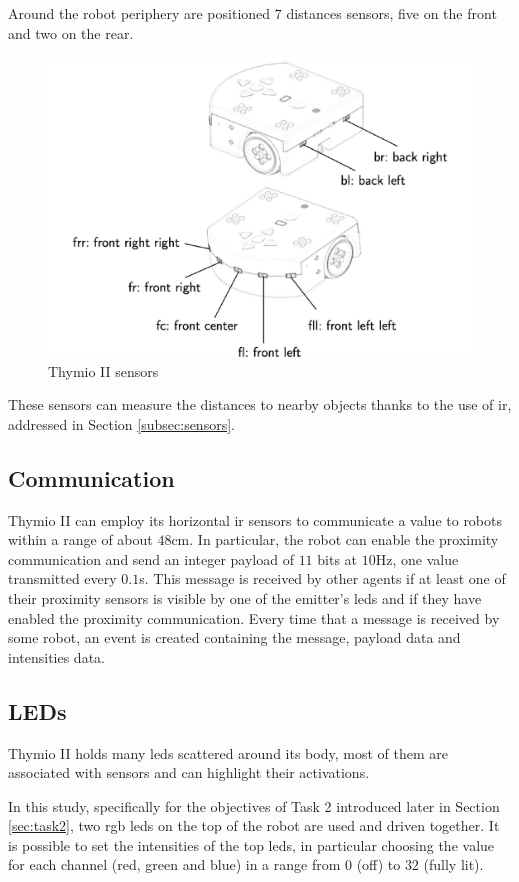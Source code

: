 Around the robot periphery are positioned $7$ distances sensors, five on the 
front and two on the rear. 
\begin{figure}[h!tb]
	\centering
	\includegraphics[width=.6\textwidth]{contents/images/thymio2x}
	\caption{Thymio II sensors}
	\label{fig:thymio sensors}
\end{figure}
These sensors can measure the distances to nearby objects thanks to the use 
of  \gls{ir}, addressed in Section \ref{subsec:sensors}.

\subsection{Communication}
\label{subsec:thymiocomm}

Thymio II can employ its horizontal \gls{ir} sensors to communicate a value 
to robots within a range of about $48$cm. 
In particular, the robot can enable the proximity communication and send an 
integer payload of $11$ bits at $10$Hz, one value transmitted every 
$0.1$s. 
This message is received by other agents if at least one of their proximity sensors 
is visible by one of the emitter’s \glspl{led} and if they have enabled the proximity 
communication.
Every time that a message is received by some robot, an event is 
created containing the message, payload data and intensities data.

\subsection{LEDs}
\label{subsec:thymioled}

Thymio II holds many \glspl{led} scattered around its body, most of them are 
associated 
with sensors and can highlight their activations.

In this study, specifically for the objectives of Task 2 introduced later in Section 
\ref{sec:task2}, two \gls{rgb} \glspl{led} on the top of the robot are used and 
driven together.
It is possible to set the intensities of the top \glspl{led}, in particular choosing the 
value for each channel (red, green and blue) in a range from $0$ (off) to $32$ 
(fully lit).

